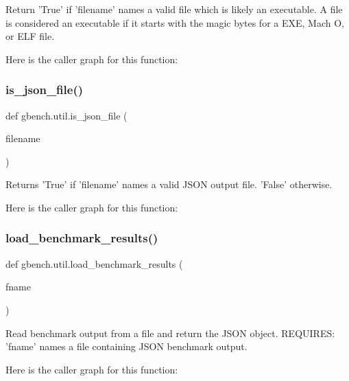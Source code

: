 \begin{DoxyVerb}Return 'True' if 'filename' names a valid file which is likely
an executable. A file is considered an executable if it starts with the
magic bytes for a EXE, Mach O, or ELF file.
\end{DoxyVerb}
 Here is the caller graph for this function\+:
\mbox{\label{namespacegbench_1_1util_a2b5de1b1f7c12819da516c50fc1f433b}} 
\subsubsection{\texorpdfstring{is\+\_\+json\+\_\+file()}{is\_json\_file()}}
{\footnotesize\ttfamily def gbench.\+util.\+is\+\_\+json\+\_\+file (\begin{DoxyParamCaption}\item[{}]{filename }\end{DoxyParamCaption})}

\begin{DoxyVerb}Returns 'True' if 'filename' names a valid JSON output file.
'False' otherwise.
\end{DoxyVerb}
 Here is the caller graph for this function\+:
\mbox{\label{namespacegbench_1_1util_a815611aefc9668cc33bf88eefb3c0138}} 
\subsubsection{\texorpdfstring{load\+\_\+benchmark\+\_\+results()}{load\_benchmark\_results()}}
{\footnotesize\ttfamily def gbench.\+util.\+load\+\_\+benchmark\+\_\+results (\begin{DoxyParamCaption}\item[{}]{fname }\end{DoxyParamCaption})}

\begin{DoxyVerb}Read benchmark output from a file and return the JSON object.
REQUIRES: 'fname' names a file containing JSON benchmark output.
\end{DoxyVerb}
 Here is the caller graph for this function\+:
\mbox{\label{namespacegbench_1_1util_ac9fcdf6c47eaec31a8ec561ab29f6968}} 
